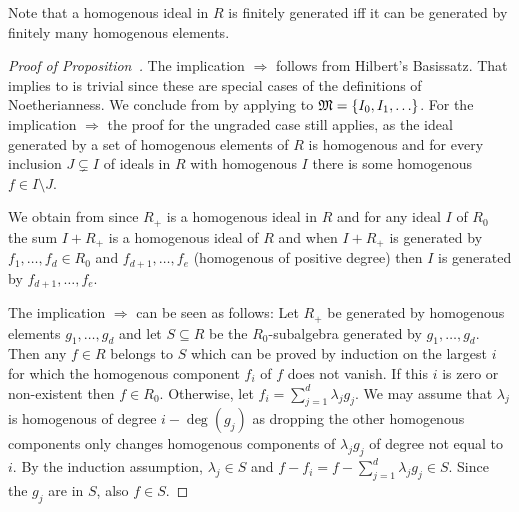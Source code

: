 \documentclass[a4paper,parskip=half,numbers=enddot, DIV=12]{scrreprt}
\begin{document}
\begin{rem}
    Note that a homogenous ideal in $R$ is finitely generated iff it can be generated by finitely many homogenous elements.
\end{rem}
\begin{proof}[Proof of Proposition~]
    The implication  $\Rightarrow$  follows from Hilbert's Basissatz. That  implies  to  is trivial since these are special cases of the definitions of Noetherianness. We conclude  from  by applying  to $\mathfrak{M}=\{I_0,I_1,\ldots\}$. For the implication  $\Rightarrow$  the proof for the ungraded case still applies, as the ideal generated by a set of homogenous elements of $R$ is homogenous and for every inclusion $J\subsetneq I$ of ideals in $R$ with homogenous $I$ there is some homogenous $f\in I\setminus J$.
    
    We obtain  from  since $R_+$ is a homogenous ideal in $R$ and for any ideal $I$ of $R_0$ the sum $I+R_+$ is a homogenous ideal of $R$ and when $I+R_+$ is generated by $f_1,\ldots, f_d\in R_0$ and $f_{d+1},\ldots,f_e$ (homogenous of positive degree) then $I$ is generated by $f_{d+1},\ldots, f_e$.
    
    The implication  $\Rightarrow$  can be seen as follows: Let $R_+$ be generated by homogenous elements $g_1,\ldots, g_d$ and let $S\subseteq R$ be the $R_0$-subalgebra generated by $g_1,\ldots, g_d$. Then any $f\in R$ belongs to $S$ which can be proved by induction on the largest $i$ for which the homogenous component $f_i$ of $f$ does not vanish. If this $i$ is zero or non-existent then $f\in R_0$. Otherwise, let $f_i = \sum_{j=1}^d \lambda_jg_j$. We may assume that $\lambda_j$ is homogenous of degree $i-\deg(g_j)$ as dropping the other homogenous components only changes homogenous components of $\lambda_j g_j$ of degree not equal to $i$. By the induction assumption, $\lambda_j\in S$ and $f-f_i = f-\sum_{j=1}^d\lambda_j g_j\in S$. Since the $g_j$ are in $S$, also $f\in S$.
\end{proof}
\end{document}
